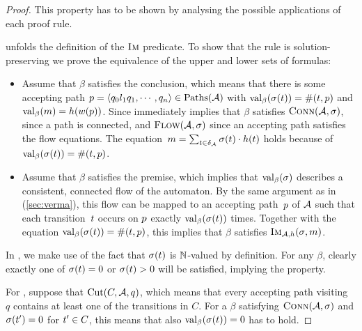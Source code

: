 \documentclass[acmsmall,review,anonymous,screen]{acmart}\settopmatter{printfolios=true,printccs=true,printacmref=true}
\theoremstyle{definition}
\begin{document}
\begin{proof}
  This property has to be shown by analysing the possible applications
  of each proof rule.

  \Expand{} unfolds the definition of the $\operatorname{\textsc{Im}}$ predicate. To show
  that the rule is solution-preserving we prove the equivalence of the
  upper and lower sets of formulas:
  \begin{itemize}
  \item Assume that $\beta$ satisfies the conclusion, which means that
    there is some accepting path
    $p = \left\langle q_0 l_1 q_1 , \cdots , q_n\right\rangle \in \operatorname{Paths}(\mathcal{A})$ with
    $\operatorname{val}_\beta(\operatorname{\sigma}(t)) = \operatorname{\#}(t,
    p)$ and $\operatorname{val}_\beta(m) =
    h(w(p))$. Since immediately implies that $\beta$
    satisfies $\operatorname{\textsc{Conn}}(\mathcal{A}, \operatorname{\sigma})$, since a path is
    connected, and $\textsc{Flow}(\mathcal{A}, \operatorname{\sigma})$ since an accepting
    path satisfies the flow equations. The
    equation~$m = \sum_{t \in
      \delta_{\mathcal{A}}}\operatorname{\sigma}(t) \cdot
    h(t)$ holds because of
    $\operatorname{val}_\beta(\operatorname{\sigma}(t)) = \operatorname{\#}(t,
    p)$.
  \item Assume that $\beta$ satisfies the premise, which implies that
    $\operatorname{val}_\beta(\operatorname{\sigma})$ describes a consistent, connected flow of
    the automaton. By the same argument as in
    \cite{generate-parikh-image} (\cref{sec:verma}), this flow
    can be mapped to an accepting path~$p$ of $\mathcal{A}$ such
    that each transition~$t$ occurs on $p$ exactly
    $\operatorname{val}_\beta(\operatorname{\sigma}(t))$ times. Together with the equation
    $\operatorname{val}_\beta(\operatorname{\sigma}(t)) = \operatorname{\#}(t,
    p)$, this implies that $\beta$ satisfies $\operatorname{\textsc{Im}}_{\mathcal{A}, h}(\operatorname{\sigma}, m)$.
  \end{itemize}

  In \Split{}, we make use of the fact that $\operatorname{\sigma}(t)$ is
  $\mathbb{N}$-valued by definition. For any $\beta$, clearly exactly
  one of $\operatorname{\sigma}(t) = 0$ or $\operatorname{\sigma}(t) > 0$ will
  be satisfied, implying the property.

  For \Propagate{}, suppose that
  $\operatorname{Cut}(C, \mathcal{A}, q)$, which means that every
  accepting path visiting~$q$ contains at least one of the transitions
  in $C$. For a $\beta$ satisfying $\operatorname{\textsc{Conn}}(\mathcal{A}, \operatorname{\sigma})$
  and $\operatorname{\sigma}(t') = 0$ for $t' \in C$, this means
  that also $\operatorname{val}_\beta(\operatorname{\sigma}(t)) = 0$ has to hold.


\end{proof}
\end{document}
